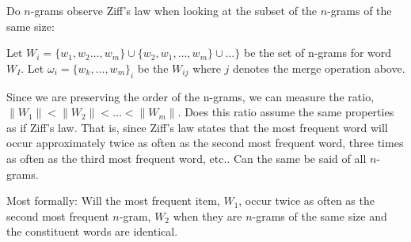 \documentclass[fontsize=12pt,english]{scrartcl}
\begin{document}
Do $n$-grams observe Ziff's law when looking at the subset of the
$n$-grams of the same size:

Let $W_i = \{w_1,w_2\ldots,w_m\} \cup \{w_2,w_1,\ldots,w_m\} \cup
\ldots\}$ be the set of n-grams for word $W_I$. Let $\omega_i =
\{w_k,\ldots,w_m\}_i$ be the $W_{ij}$ where $j$ denotes the merge
operation above.

Since we are preserving the order of the n-grams, we can measure the
ratio, $\|W_1\| < \|W_2\| <\ldots < \|W_m\|$.  Does this ratio assume
the same properties as if Ziff's law.  That is, since Ziff's law
states that the most frequent word will occur approximately twice as
often as the second most frequent word, three times as often as the
third most frequent word, etc.. Can the same be said of all $n$-grams.

Most formally: Will the most frequent item, $W_1$, occur twice as
often as the second most frequent $n$-gram, $W_2$ when they are
$n$-grams of the same size and the constituent words are identical.
\end{document}
